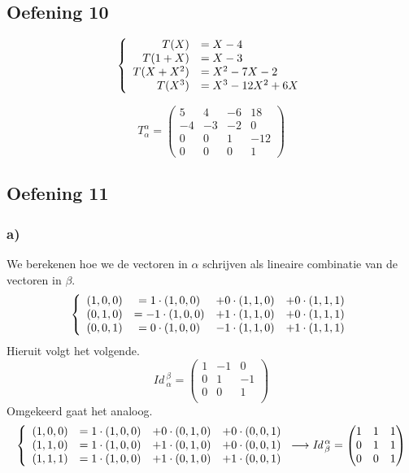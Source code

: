 \documentclass[lineaire_algebra_oplossingen.tex]{subfiles}
\begin{document}
\subsection{Oefening 10}
\[
\left\lbrace
\begin{array}{r l}
T(X) &= X-4\\
T(1+X) &= X-3\\
T(X+X^2) &= X^2-7X-2\\
T(X^3) &= X^3-12X^2+6X\\
\end{array}
\right.
\]

\[
T^{\alpha}_{\alpha} =
\begin{pmatrix}
5 & 4 & -6 & 18\\
-4 & -3 & -2 & 0\\
0 & 0 & 1 & -12\\
0 & 0 & 0 & 1
\end{pmatrix}
\]

\subsection{Oefening 11}
\subsubsection*{a)}
We berekenen hoe we de vectoren in $\alpha$ schrijven als lineaire combinatie van de vectoren in $\beta$.
\[
\left\lbrace
\begin{array}{c c c c}
(1,0,0) &= 1\cdot (1,0,0) &+ 0\cdot (1,1,0) &+ 0\cdot (1,1,1)\\
(0,1,0) &= -1\cdot(1,0,0) &+ 1\cdot (1,1,0) &+ 0\cdot (1,1,1)\\
(0,0,1) &= 0\cdot(1,0,0) &-1\cdot (1,1,0) &+ 1\cdot (1,1,1)
\end{array}
\right.
\]
Hieruit volgt het volgende.
\[
\textit{Id}\,_\alpha^\beta = 
\begin{pmatrix}
1 & -1 & 0\\
0 & 1 & -1\\
0 & 0 & 1\\
\end{pmatrix}
\]
Omgekeerd gaat het analoog.
\[
\left\lbrace
\begin{array}{c c c c}
(1,0,0) &= 1\cdot (1,0,0) &+ 0\cdot (0,1,0) &+ 0\cdot (0,0,1)\\
(1,1,0) &= 1\cdot (1,0,0) &+ 1\cdot (0,1,0) &+ 0\cdot (0,0,1)\\
(1,1,1) &= 1\cdot (1,0,0) &+ 1\cdot (0,1,0) &+ 1\cdot (0,0,1)
\end{array}
\right.
\longrightarrow
\textit{Id}\,_\beta^\alpha = 
\begin{pmatrix}
1 & 1 & 1\\
0 & 1 & 1\\
0 & 0 & 1\\
\end{pmatrix}
\]
\end{document}
